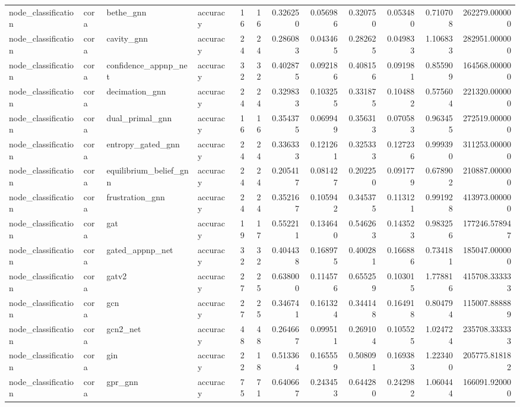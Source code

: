 \begin{tabular}{llllrrrrrrrr}
node_classification & cora & bethe_gnn & accuracy & 16 & 16 & 0.326250 & 0.056986 & 0.320750 & 0.053480 & 0.710708 & 262279.000000 \\
node_classification & cora & cavity_gnn & accuracy & 24 & 24 & 0.286083 & 0.043465 & 0.282625 & 0.049833 & 1.106833 & 282951.000000 \\
node_classification & cora & confidence_appnp_net & accuracy & 32 & 32 & 0.402875 & 0.092186 & 0.408156 & 0.091981 & 0.855909 & 164568.000000 \\
node_classification & cora & decimation_gnn & accuracy & 24 & 24 & 0.329833 & 0.103255 & 0.331875 & 0.104882 & 0.575604 & 221320.000000 \\
node_classification & cora & dual_primal_gnn & accuracy & 16 & 16 & 0.354375 & 0.069949 & 0.356313 & 0.070583 & 0.963455 & 272519.000000 \\
node_classification & cora & entropy_gated_gnn & accuracy & 24 & 24 & 0.336333 & 0.121261 & 0.325333 & 0.127236 & 0.999390 & 311253.000000 \\
node_classification & cora & equilibrium_belief_gnn & accuracy & 24 & 24 & 0.205417 & 0.081427 & 0.202250 & 0.091779 & 0.678902 & 210887.000000 \\
node_classification & cora & frustration_gnn & accuracy & 24 & 24 & 0.352167 & 0.105942 & 0.345375 & 0.113121 & 0.991928 & 413973.000000 \\
node_classification & cora & gat & accuracy & 19 & 17 & 0.552211 & 0.134640 & 0.546263 & 0.143523 & 0.983256 & 177246.578947 \\
node_classification & cora & gated_appnp_net & accuracy & 32 & 32 & 0.404438 & 0.168975 & 0.400281 & 0.166886 & 0.734181 & 185047.000000 \\
node_classification & cora & gatv2 & accuracy & 27 & 25 & 0.638000 & 0.114576 & 0.655259 & 0.103015 & 1.778816 & 415708.333333 \\
node_classification & cora & gcn & accuracy & 27 & 25 & 0.346741 & 0.161324 & 0.344148 & 0.164918 & 0.804794 & 115007.888889 \\
node_classification & cora & gcn2_net & accuracy & 48 & 48 & 0.264667 & 0.099511 & 0.269104 & 0.105525 & 1.024724 & 235708.333333 \\
node_classification & cora & gin & accuracy & 22 & 18 & 0.513364 & 0.165559 & 0.508091 & 0.169383 & 1.223400 & 205775.818182 \\
node_classification & cora & gpr_gnn & accuracy & 75 & 71 & 0.640667 & 0.243453 & 0.644280 & 0.242982 & 1.060444 & 166091.920000 \\

\end{tabular}
